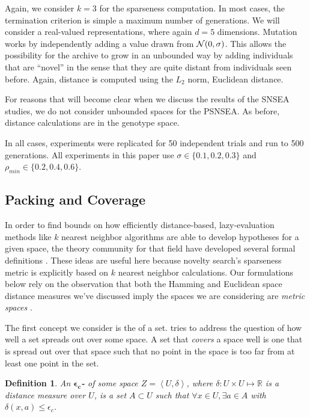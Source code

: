\documentclass[twoside]{article}
\newtheorem{definition}{Definition}
\newcommand{\IR}{\mathbb{R}}
\begin{document}
Again, we consider $k=3$ for the sparseness computation.  In most cases, the termination criterion is simple a maximum number of generations.  We will consider a real-valued representations, where again $d=5$ dimensions.  Mutation works by independently adding a value drawn from ${\cal N}(0,\sigma)$.  This allows the possibility for the archive to grow in an unbounded way by adding individuals that are ``novel'' in the sense that they are quite distant from individuals seen before.  Again, distance is computed using the $L_2$ norm, Euclidean distance.

For reasons that will become clear when we discuss the results of the SNSEA studies, we do not consider unbounded spaces for the PSNSEA.  As before, distance calculations are in the genotype space.

In all cases, experiments were replicated for 50 independent trials and run to 500 generations. All experiments in this paper use $\sigma\in\{0.1,0.2,0.3\}$ and $\rho_{min} \in \{0.2,0.4,0.6\}$. 


\subsection{Packing and Coverage}
\label{subsec:knn}

In order to find bounds on how efficiently distance-based, lazy-evaluation methods like $k$ nearest neighbor algorithms are able to develop hypotheses for a given space, the theory community for that field have developed several formal definitions \citep{Clarkson1999dcg}.  These ideas are useful here because novelty search's sparseness metric is explicitly based on $k$ nearest neighbor calculations.  Our formulations below rely on the observation that both the Hamming and Euclidean space distance measures we've discussed imply the spaces we are considering are \emph{metric spaces} \citep{Bryant1985}.

The first concept we consider is the  of a set.   tries to address the question of how well a set spreads out over some space.  A set that \emph{covers} a space well is one that is spread out over that space such that no point in the space is too far from at least one point in the set.

\begin{definition}
An $\boldsymbol{\epsilon_c}$\textbf{-} of some space $Z=\left\langle U, \delta\right\rangle$, where $\delta: U\times U \mapsto \IR$ is a distance measure over $U$, is a set $A \subset U$ such that $\forall x\in U, \exists a\in A$ with $\delta(x,a) \leq \epsilon_c$. 
\end{definition}
\end{document}
